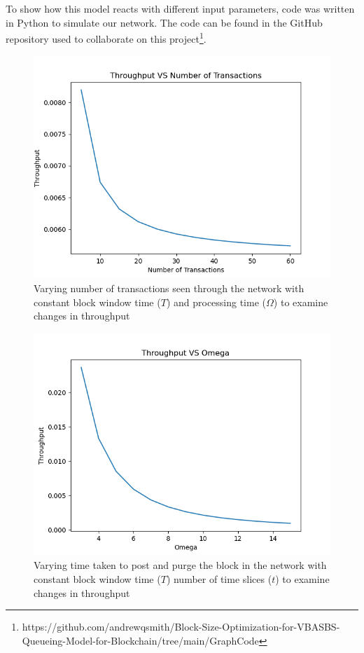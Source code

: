 \documentclass[conference]{IEEEtran}
\begin{document}
To show how this model reacts with different input parameters, code was written in Python
to simulate our network. The code can be found in the GitHub repository used to collaborate
on this project\footnote{https://github.com/andrewqsmith/Block-Size-Optimization-for-VBASBS-Queueing-Model-for-Blockchain/tree/main/GraphCode}.

\begin{figure}[htbp]
    \centerline{\includegraphics[width=\linewidth]{Figures/ThroughputVSNoOfTrnxConstOmega.png}}
    \caption{Varying number of transactions seen through the network with constant block window time ($T$) and processing time ($\Omega$) to examine changes in throughput}
    \label{TP_trans}
\end{figure}

\begin{figure}[htbp]
    \centerline{\includegraphics[width=\linewidth]{Figures/ThoughtputVSOmegaConstTrnx.png}}
    \caption{Varying time taken to post and purge the block in the network with constant block window time ($T$) number of time slices ($t$) to examine changes in throughput}
    \label{TP_omega}
\end{figure}
\end{document}
